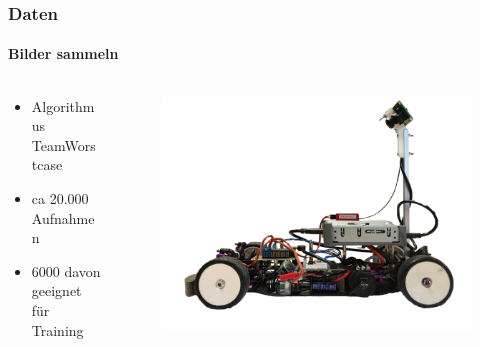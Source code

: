 \documentclass{beamer}
\begin{document}
\begin{frame}
\frametitle{Daten}
\framesubtitle{Bilder sammeln}

\begin{columns}[T]

\begin{column}[T]{5cm}
\begin{itemize}
\item{Algorithmus TeamWorstcase}
\item{ca 20.000 Aufnahmen}
\item{6000  davon geeignet für Training}

\end{itemize}

\end{column}

\begin{column}[T]{5cm}
	\begin{figure}
	\centering
	\includegraphics[width=0.4\linewidth]{figures/Fahrzeug.png}	 
	\label{img:fahrzeug}
\end{figure}
\end{column}

\end{columns}




\end{frame}
\end{document}

